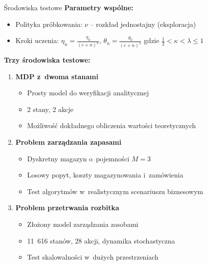 \documentclass[aspectratio=169]{beamer}
\begin{document}
\begin{frame}{Środowiska testowe}
\textbf{Parametry wspólne:}
\begin{itemize}
    \item Polityka próbkowania: $\nu$ -- rozkład jednostajny (eksploracja)
    \item Kroki uczenia: $\eta_n = \frac{\eta_0}{(c + n)^{\kappa}}$, $\theta_n = \frac{\theta_0}{(c + n)^{\lambda}}$ gdzie $\frac{1}{2} < \kappa < \lambda \le 1$
\end{itemize}

\vspace{0.5em}
\textbf{Trzy środowiska testowe:}
\begin{enumerate}
    \item \textbf{MDP z~dwoma stanami}
    \begin{itemize}
        \item Prosty model do weryfikacji analitycznej
        \item 2 stany, 2 akcje
        \item Możliwość dokładnego obliczenia wartości teoretycznych
    \end{itemize}
    
    \vspace{0.3em}
    \item \textbf{Problem zarządzania zapasami}
    \begin{itemize}
        \item Dyskretny magazyn o~pojemności $M=3$
        \item Losowy popyt, koszty magazynowania i~zamówienia
        \item Test algorytmów w~realistycznym scenariuszu biznesowym
    \end{itemize}
    
    \vspace{0.3em}
    \item \textbf{Problem przetrwania rozbitka}
    \begin{itemize}
        \item Złożony model zarządzania zasobami
        \item 11~616 stanów, 28 akcji, dynamika stochastyczna
        \item Test skalowalności w~dużych przestrzeniach
    \end{itemize}
\end{enumerate}
\end{frame}
\end{document}
